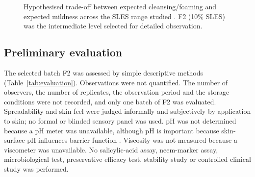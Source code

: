 \documentclass[10pt,a4paper,twocolumn]{article}
\begin{document}
\begin{figure}[t]
\centering
{}
\caption{Hypothesised trade-off between expected cleansing/foaming and
expected mildness across the SLES range studied  \citep{ananthapadmanabhan2004,subramanyan2004}.
F2 (10\% SLES) was the intermediate level selected for detailed
observation.}
\label{fig:sles}
\end{figure}

\subsection{Preliminary evaluation}

The selected batch F2 was assessed by simple descriptive methods
(Table~\ref{tab:evaluation}). Observations were not quantified. The
number of observers, the number of replicates, the observation period and
the storage conditions were not recorded, and only one batch of F2 was
evaluated. Spreadability and skin feel were judged informally and
subjectively by application to skin; no formal or blinded sensory panel
was used. pH was not determined because a pH meter was unavailable,
although pH is important because skin-surface pH influences barrier
function \citep{schmid2006}. Viscosity was not measured because a
viscometer was unavailable. No salicylic-acid assay, neem-marker assay,
microbiological test, preservative efficacy test, stability study or
controlled clinical study was performed.
\end{document}
